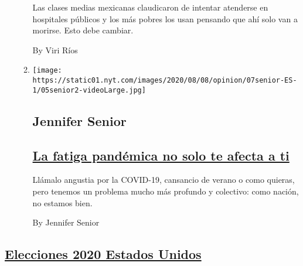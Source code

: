 \begin{enumerate}
\begin{enumerate}
    Las clases medias mexicanas claudicaron de intentar atenderse en
    hospitales públicos y los más pobres los usan pensando que ahí solo
    van a morirse. Esto debe cambiar.

    By Viri Ríos
  \item
    \texttt{[image: https://static01.nyt.com/images/2020/08/08/opinion/07senior-ES-1/05senior2-videoLarge.jpg]}

    \hypertarget{jennifer-senior}{%
    \subsection{Jennifer Senior}\label{jennifer-senior}}

    \hypertarget{la-fatiga-panduxe9mica-no-solo-te-afecta-a-ti}{%
    \subsection{\texorpdfstring{\href{/es/2020/08/07/espanol/opinion/ansiedad-coronavirus.html}{La
    fatiga pandémica no solo te afecta a
    ti}}{La fatiga pandémica no solo te afecta a ti}}\label{la-fatiga-panduxe9mica-no-solo-te-afecta-a-ti}}

    Llámalo angustia por la COVID-19, cansancio de verano o como
    quieras, pero tenemos un problema mucho más profundo y colectivo:
    como nación, no estamos bien.

    By Jennifer Senior
  \end{enumerate}
\end{enumerate}

\hypertarget{elecciones-2020-estados-unidos}{%
\subsection{\texorpdfstring{\protect\hyperlink{}{Elecciones 2020 Estados
Unidos}}{Elecciones 2020 Estados Unidos}}\label{elecciones-2020-estados-unidos}}

